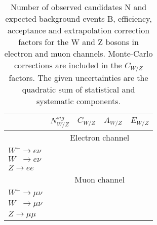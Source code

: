 \begin{table}[!tbp]
\begin{center}
\caption{Number of observed candidates N and expected background events B, efficiency, acceptance and extrapolation correction factors for the W and Z bosons in electron and muon channels. Monte-Carlo corrections are included in the $C_{W/Z}$ factors. The given uncertainties are the quadratic sum of statistical and systematic components.}
\label{tab:Values}
\begin{tabular}{l | c c c c }
\hline
\hline
 & $N_{W/Z}^{sig}$ & $C_{W/Z}$ & $A_{W/Z}$ & $E_{W/Z}$ \\
 \hline
& \multicolumn{4}{c}{Electron channel}\\
 \hline
 $W^{+}\to e\nu$  & & & & \\
 $W^{-}\to e\nu$ & & & & \\
 $Z \to ee$ & & & & \\
 \hline
 & \multicolumn{4}{c}{Muon channel} \\
  \hline
  $W^{+}\to \mu\nu$  & & & & \\
 $W^{-}\to \mu\nu$ & & & & \\
 $Z \to \mu \mu $ & & & & \\
 \hline
\end{tabular}
\end{center}
\end{table}